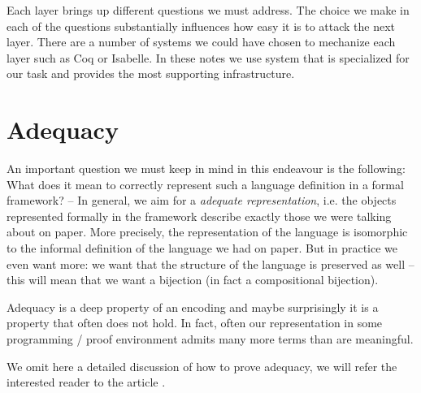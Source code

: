 Each layer brings up different questions we must address. The choice
we make in each of the questions substantially influences how easy it
is to attack the next layer.  There are a number of systems we could have chosen to mechanize each layer such as Coq or Isabelle. In these notes we use system that is specialized for our task and provides the most supporting infrastructure. 
 

\section{Adequacy} An important question we must keep in mind in
this endeavour is the following: 
What does it mean to correctly represent such a language
definition in a formal framework? -- In general, we aim for a
\emph{adequate representation}, i.e. the objects represented formally
in the framework describe exactly those we were talking about on
paper. More precisely, the representation of the language is
isomorphic to the informal definition of the language we had on
paper. But in practice we even want more: we want that the structure
of the language is preserved as well -- this will mean that we want a
bijection (in fact a compositional bijection).


Adequacy is a deep property of an encoding and maybe surprisingly it
is a property that often does not hold. In fact, often our
representation in some programming / proof environment admits many
more terms than are meaningful. 

We omit here a detailed discussion of how to prove adequacy, we
will refer the interested reader to the article
\citep{HarperLicata:JFP07}. 